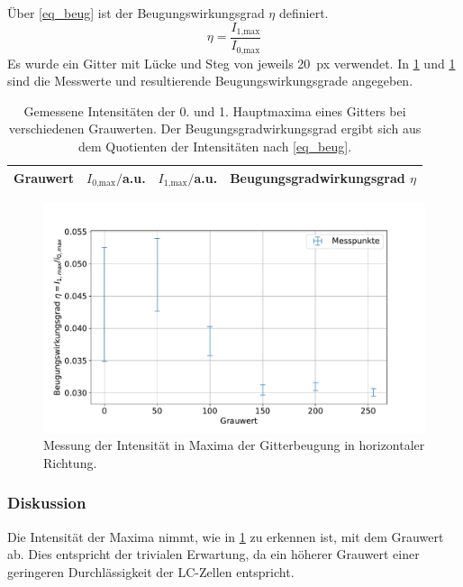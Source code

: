 \documentclass[
	a4paper,
	12pt,
	pagesize,
	ngerman
]{scrartcl}
\begin{document}
		Über \cref{eq_beug} ist der Beugungswirkungsgrad $\eta$ definiert.
		\begin{equation}
			\label{eq_beug}
			\eta = \frac{I_\text{1,max}}{I_\text{0,max}}
		\end{equation}
		Es wurde ein Gitter mit Lücke und Steg von jeweils \SI{20}{px} verwendet.
		In \cref{tb_beug} und \cref{fig_beug} sind die Messwerte und resultierende Beugungswirkungsgrade angegeben.
\begin{table}[H]
		\centering
		\begin{tabular}{ c | c | c | c }
			 Grauwert & $I_\text{0,max}/$a.u. &$I_\text{1,max}/$a.u.&  Beugungsgradwirkungsgrad $\eta$ \\ \hline
			 
		\end{tabular}
		\caption{
		Gemessene Intensitäten der 0. und 1. Hauptmaxima eines Gitters bei verschiedenen Grauwerten.
		Der Beugungsgradwirkungsgrad ergibt sich aus dem Quotienten der Intensitäten nach \cref{eq_beug}.
		}
		\label{tb_beug}
\end{table}
\begin{figure}[H] %
			\includegraphics[width=0.8\linewidth]{img/beugungsgrad}
			\caption{
			Messung der Intensität in Maxima der Gitterbeugung in horizontaler Richtung.
			}
			\label{fig_beug}
	\end{figure}

			\subsubsection*{Diskussion}
			Die Intensität der Maxima nimmt, wie in \cref{tb_beug} zu erkennen ist, mit dem Grauwert ab.
			Dies entspricht der trivialen Erwartung, da ein höherer Grauwert einer geringeren Durchlässigkeit der LC-Zellen entspricht.
\end{document}
